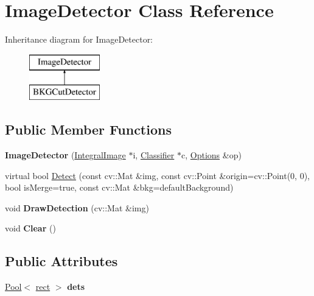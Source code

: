 \hypertarget{classImageDetector}{}\section{Image\+Detector Class Reference}
\label{classImageDetector}
Inheritance diagram for Image\+Detector\+:\begin{figure}[H]
\begin{center}
\leavevmode
\includegraphics[height=2.000000cm]{classImageDetector}
\end{center}
\end{figure}
\subsection*{Public Member Functions}
\begin{DoxyCompactItemize}
\item 
\hypertarget{classImageDetector_ae661e19aa8fce824ff3e159efae1dd71}{}{\bfseries Image\+Detector} (\hyperlink{classIntegralImage}{Integral\+Image} $\ast$i, \hyperlink{classClassifier}{Classifier} $\ast$c, \hyperlink{structOptions}{Options} \&op)\label{classImageDetector_ae661e19aa8fce824ff3e159efae1dd71}

\item 
virtual bool \hyperlink{classImageDetector_aca346dbe30c325653c6c9ef1a0ffd0b2}{Detect} (const cv\+::\+Mat \&img, const cv\+::\+Point \&origin=cv\+::\+Point(0, 0), bool is\+Merge=true, const cv\+::\+Mat \&bkg=default\+Background)
\item 
\hypertarget{classImageDetector_a866cc9f2e6b109ea8a897e96c4b106a1}{}void {\bfseries Draw\+Detection} (cv\+::\+Mat \&img)\label{classImageDetector_a866cc9f2e6b109ea8a897e96c4b106a1}

\item 
\hypertarget{classImageDetector_a2293f8558975b3404dae1ed077d47580}{}void {\bfseries Clear} ()\label{classImageDetector_a2293f8558975b3404dae1ed077d47580}

\end{DoxyCompactItemize}
\subsection*{Public Attributes}
\begin{DoxyCompactItemize}
\item 
\hypertarget{classImageDetector_a38b4eb45a8506399546219cc17886f7c}{}\hyperlink{classPool}{Pool}$<$ \hyperlink{structrect}{rect} $>$ {\bfseries dets}\label{classImageDetector_a38b4eb45a8506399546219cc17886f7c}

\end{DoxyCompactItemize}
